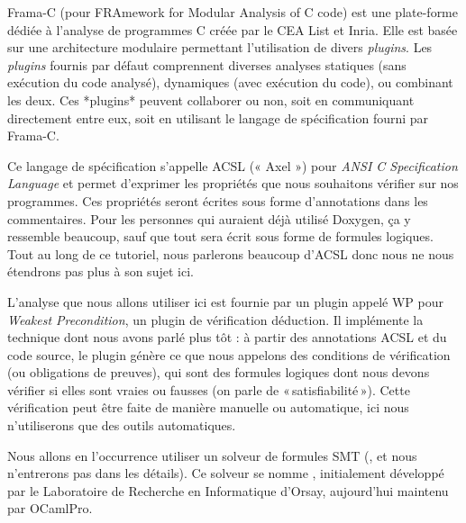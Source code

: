 





Frama-C (pour FRAmework for Modular Analysis of C code) est une plate-forme
 dédiée à l'analyse de programmes C créée par le CEA List et Inria. Elle est
 basée sur une architecture modulaire permettant l'utilisation de divers
 \textit{plugins}. Les \textit{plugins} fournis par défaut comprennent diverses
 analyses statiques (sans exécution du code analysé), dynamiques (avec
 exécution du code), ou combinant les deux. Ces *plugins* peuvent collaborer
 ou non, soit en communiquant directement entre eux, soit en utilisant le
 langage de spécification fourni par Frama-C.



Ce langage de spécification s'appelle ACSL (« Axel »)
pour \textit{ANSI C Specification Language} et permet d'exprimer les
propriétés que nous souhaitons vérifier sur nos programmes. Ces propriétés seront
écrites sous forme d'annotations dans les commentaires. Pour les personnes qui
auraient déjà utilisé Doxygen, ça y ressemble beaucoup, sauf que tout sera
écrit sous forme de formules logiques. Tout au long de ce tutoriel, nous parlerons
beaucoup d'ACSL donc nous ne nous étendrons pas plus à son sujet ici.



L'analyse que nous allons utiliser ici est fournie par un plugin appelé WP pour
\textit{Weakest Precondition}, un plugin de vérification déduction. Il implémente
la technique dont nous avons parlé plus tôt :
à partir des annotations ACSL et du code source, le plugin génère ce que nous
appelons des conditions de vérification (ou obligations de preuves), qui sont
des formules logiques dont nous devons vérifier si elles sont vraies ou fausses
(on parle de « satisfiabilité »). Cette vérification peut être faite de manière
manuelle ou automatique, ici nous n'utiliserons que des outils automatiques.



Nous allons en l'occurrence utiliser un solveur de formules SMT
(,
et nous n'entrerons pas dans les détails). Ce solveur se nomme
, initialement développé par le Laboratoire
de Recherche en Informatique d'Orsay, aujourd'hui maintenu par
OCamlPro.



